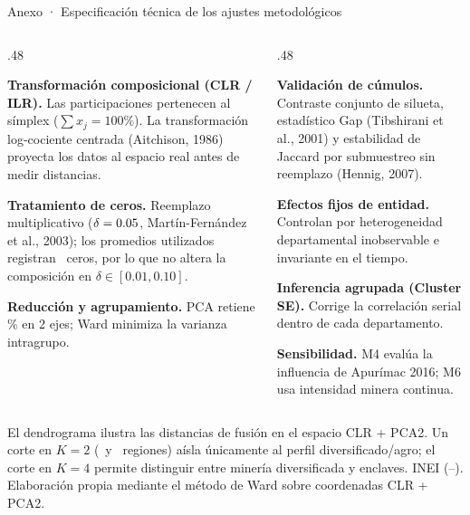 \documentclass[aspectratio=169,11pt]{beamer}
\begin{document}
\appendix
\begin{frame}[t]{Anexo · Especificación técnica de los ajustes metodológicos}
\vspace{.08cm}
{\footnotesize
\begin{columns}[T,onlytextwidth]
\begin{column}{.48\textwidth}
\begin{keybox}[equal height group=g16]
\textbf{Transformación composicional (CLR / ILR).} Las participaciones pertenecen al símplex ($\sum x_j = 100\%$). La transformación log-cociente centrada (Aitchison, 1986) proyecta los datos al espacio real antes de medir distancias.\par\smallskip
\textbf{Tratamiento de ceros.} Reemplazo multiplicativo ($\delta=0.05$, Martín-Fernández et al., 2003); los promedios utilizados registran \Zeros\ ceros, por lo que no altera la composición en $\delta \in [0.01, 0.10]$.\par\smallskip
\textbf{Reducción y agrupamiento.} PCA retiene \PcaCumulative\% en 2 ejes; Ward minimiza la varianza intragrupo.
\end{keybox}
\end{column}
\begin{column}{.48\textwidth}
\begin{keybox}[equal height group=g16]
\textbf{Validación de cúmulos.} Contraste conjunto de silueta, estadístico Gap (Tibshirani et al., 2001) y estabilidad de Jaccard por submuestreo sin reemplazo (Hennig, 2007).\par\smallskip
\textbf{Efectos fijos de entidad.} Controlan por heterogeneidad departamental inobservable e invariante en el tiempo.\par\smallskip
\textbf{Inferencia agrupada (Cluster SE).} Corrige la correlación serial dentro de cada departamento.\par\smallskip
\textbf{Sensibilidad.} M4 evalúa la influencia de Apurímac 2016; M6 usa intensidad minera continua.
\end{keybox}
\end{column}
\end{columns}
}
\end{frame}

{El dendrograma ilustra las distancias de fusión en el espacio CLR + PCA2. Un corte en $K=2$ (\WardSmallCount\ y \WardLargeCount\ regiones) aísla únicamente al perfil diversificado/agro; el corte en $K=4$ permite distinguir entre minería diversificada y enclaves.}
{INEI (\PreStart--\PreEnd). Elaboración propia mediante el método de Ward sobre coordenadas CLR + PCA2.}
\end{document}
